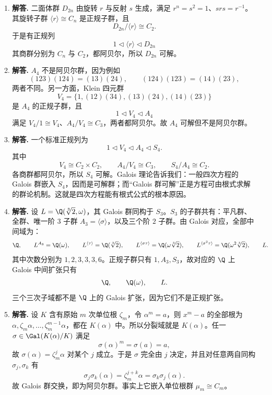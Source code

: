 \begin{enumerate}[label=\textbf{\arabic*.}, leftmargin=*, itemsep=1em]
\item \textbf{解答.} 二面体群 $D_{2n}$ 由旋转 $r$ 与反射 $s$ 生成，满足 $r^n=s^2=1$、$srs=r^{-1}$。其旋转子群 $\langle r\rangle\cong C_n$ 是正规子群，且
\[
D_{2n}/\langle r\rangle\cong C_2.
\]
于是有正规列
\[
1\triangleleft \langle r\rangle \triangleleft D_{2n}
\]
其商群分别为 $C_n$ 与 $C_2$，都阿贝尔，所以 $D_{2n}$ 可解。

\item \textbf{解答.} $A_4$ 不是阿贝尔群，因为例如
\[
(123)(124)=(13)(24),\qquad (124)(123)=(14)(23),
\]
两者不同。另一方面，Klein 四元群
\[
V_4=\{1,(12)(34),(13)(24),(14)(23)\}
\]
是 $A_4$ 的正规子群，且
\[
1\triangleleft V_4\triangleleft A_4
\]
满足 $V_4/1\cong V_4$、$A_4/V_4\cong C_3$，两者都阿贝尔。故 $A_4$ 可解但不是阿贝尔群。

\item \textbf{解答.} 一个标准正规列为
\[
1\triangleleft V_4\triangleleft A_4\triangleleft S_4.
\]
其中
\[
V_4\cong C_2\times C_2,
\qquad A_4/V_4\cong C_3,
\qquad S_4/A_4\cong C_2.
\]
各商群都阿贝尔，所以 $S_4$ 可解。Galois 理论告诉我们：一般四次方程的 Galois 群嵌入 $S_4$，因而是可解群；而“Galois 群可解”正是方程可由根式求解的群论机制。这就是四次方程能有根式公式的根本原因。

\item \textbf{解答.} 设 $L=\Q(\sqrt[3]{2},\omega)$，其 Galois 群同构于 $S_3$。$S_3$ 的子群共有：平凡群、全群、唯一阶 $3$ 子群 $A_3=\langle\sigma\rangle$，以及三个阶 $2$ 子群。由 Galois 对应，全部中间域为：
\[
\Q,
\qquad L^{A_3}=\Q(\omega),
\qquad L^{\langle\tau\rangle}=\Q(\sqrt[3]{2}),
\qquad L^{\langle\sigma\tau\rangle}=\Q(\omega\sqrt[3]{2}),
\qquad L^{\langle\sigma^2\tau\rangle}=\Q(\omega^2\sqrt[3]{2}),
\qquad L.
\]
其中次数分别为 $1,2,3,3,3,6$。正规子群只有 $1,A_3,S_3$，故对应的 $\Q$ 上 Galois 中间扩张只有
\[
\Q,\qquad \Q(\omega),\qquad L.
\]
三个三次子域都不是 $\Q$ 上的 Galois 扩张，因为它们不是正规扩张。

\item \textbf{解答.} 设 $K$ 含有原始 $m$ 次单位根 $\zeta_m$，令 $\alpha^m=a$，则 $x^m-a$ 的全部根为 $\alpha,\zeta_m\alpha,\dots,\zeta_m^{m-1}\alpha$，都在 $K(\alpha)$ 中。所以分裂域就是 $K(\alpha)$。任一 $\sigma\in\Gal(K(\alpha)/K)$ 满足
\[
\sigma(\alpha)^m=\sigma(a)=a,
\]
故 $\sigma(\alpha)=\zeta_m^j\alpha$ 对某个 $j$ 成立。于是 $\sigma$ 完全由 $j$ 决定，并且对任意两自同构 $\sigma_j,\sigma_k$ 有
\[
\sigma_j\sigma_k(\alpha)=\zeta_m^{j+k}\alpha=\sigma_k\sigma_j(\alpha).
\]
故 Galois 群交换，即为阿贝尔群。事实上它嵌入单位根群 $\mu_m\cong C_m$。


\end{enumerate}

